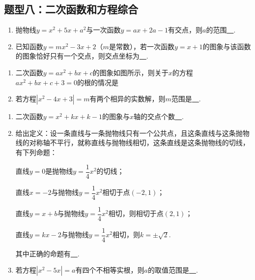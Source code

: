 \documentclass[10pt]{ctexart}
\newcommand{\abs}[1]{\left| #1 \right|}
\begin{document}
\subsection{题型八：二次函数和方程综合}
\begin{dkyi}{}{}
  \begin{enumerate}[(1)]
  \item 抛物线$y=x^2+5x+a^2$与一次函数$y=ax+2a-1$有交点，则$a$的范围\underline{~\hspace{1cm}~}.
  \item 已知函数$y=mx^2-3x+2$（$m$是常数），若一次函数$y=x+1$的图象与该函数的图象恰好只有一个交点，则交点坐标为\underline{~\hspace{1cm}~}.
  \end{enumerate}
\end{dkyi}
\begin{dkyi}{}{}
  \begin{enumerate}[(1)]
  \item 二次函数$y=ax^2+bx+c$的图象如图所示，则关于$x$的方程$ax^2+bx+c+3=0$的根的情况是
  
  \item 若方程$\abs{x^2-4x+3}=m$有两个相异的实数解，则$m$范围是\underline{~\hspace{1cm}~}.
  \end{enumerate}
\end{dkyi}
\begin{jply}{}{}
   \begin{enumerate}[(1)]
   \item 二次函数$y=x^2+kx+k-1$的图象与$x$轴的交点个数\underline{~\hspace{1cm}~}.
   \item 给出定义：设一条直线与一条抛物线只有一个公共点，且这条直线与这条抛物线的对称轴不平行，就称直线与抛物线相切，这条直线是这条抛物线的切线，有下列命题：
   
   直线$y=0$是抛物线$y=\dfrac{1}{4}x^2$的切线；
   
   直线$x=-2$与抛物线$y=\dfrac{1}{4}x^2$相切于点$(-2,1)$；
   
   直线$y=x+b$与抛物线$y=\dfrac{1}{4}x^2$相切，则相切于点$(2,1)$；
   
   直线$y=kx-2$与抛物线$y=\dfrac{1}{4}x^2$相切，则$k=\pm \sqrt{2}$.
   
   其中正确的命题有\underline{~\hspace{1cm}~}.
   \item 若方程$\abs{x^2-5x}=a$有四个不相等实根，则$a$的取值范围是\underline{~\hspace{1cm}~}.
   \end{enumerate}
\end{jply}
\end{document}
